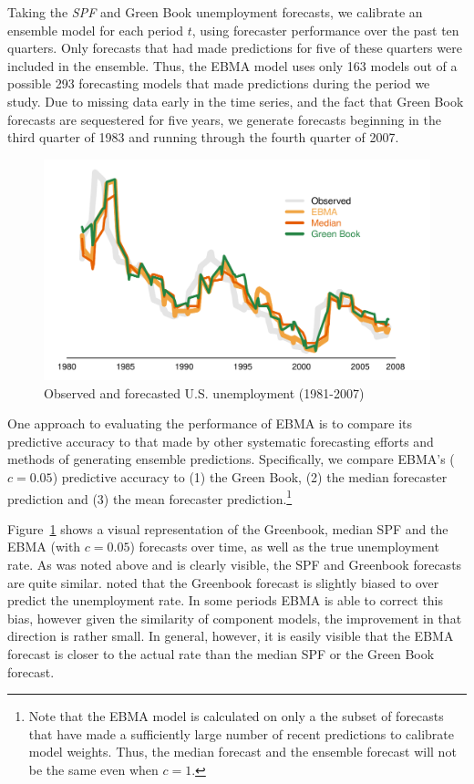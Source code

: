 \documentclass[12pt,fullpage,endnotes]{article}
\begin{document}
Taking the \textit{SPF} and Green Book unemployment forecasts, we
calibrate an ensemble model for each period $t$, using forecaster
performance over the past ten quarters.  Only forecasts that had made
predictions for five of these quarters were included in the ensemble.
Thus, the EBMA model uses only 163 models out of a possible 293
forecasting models that made predictions during the period we study.
Due to missing data early in the time series, and the fact that Green
Book forecasts are sequestered for five years, we generate forecasts
beginning in the third quarter of 1983 and running through the fourth
quarter of 2007.



\begin{figure}[h]
\caption{Observed and forecasted U.S. unemployment (1981-2007)}
\label{timeSeries}
\begin{center}
\includegraphics[scale=.8]{mdwtimeSeries2}
\end{center}
\end{figure}


One approach to evaluating the performance of EBMA is to compare its
predictive accuracy to that made by other systematic forecasting
efforts and methods of generating ensemble predictions.  Specifically,
we compare EBMA's ($c=0.05$) predictive accuracy to (1) the Green
Book, (2) the median forecaster prediction and (3) the mean forecaster
prediction.\footnote{Note that the EBMA model is calculated on only a
  the subset of forecasts that have made a sufficiently large number
  of recent predictions to calibrate model weights.  Thus, the median
  forecast and the ensemble forecast will not be the same even when
  $c=1$.} 

Figure~\ref{timeSeries} shows a visual representation of the
Greenbook, median SPF and the EBMA (with $c=0.05$) forecasts over
time, as well as the true unemployment rate. As was noted above and is
clearly visible, the SPF and Greenbook forecasts are quite
similar. \citet{Baghestani:2008} noted that the Greenbook forecast is
slightly biased to over predict the unemployment rate. In some periods
EBMA is able to correct this bias, however given the similarity of
component models, the improvement in that direction is rather
small. In general, however, it is easily visible that the EBMA
forecast is closer to the actual rate than the median SPF or the Green
Book forecast.
\end{document}
